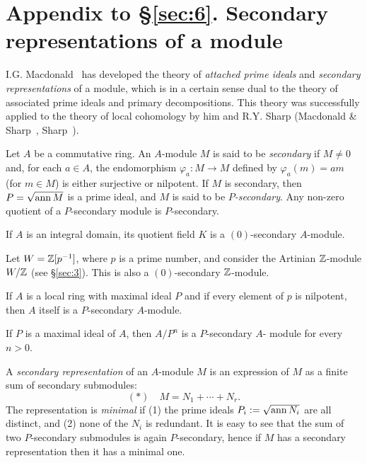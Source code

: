 \section*{Appendix to \S\ref{sec:6}. Secondary representations of a module}
{}

I.G. Macdonald~\cite{MacD1} has developed the theory of \emph{attached prime ideals}
and \emph{secondary representations} of a module, which is in a certain sense
dual to the theory of associated prime ideals and primary decompositions.
This theory was successfully applied to the theory of local cohomology
by him and R.Y. Sharp (Macdonald \& Sharp~\cite{MS1}, Sharp~\cite{Shar7}).

Let $A$ be a commutative ring. An $A$-module $M$ is said to be \emph{secondary}
if $M \neq 0$ and, for each $a \in A$, the endomorphism $\varphi_a\colon M \to M$ defined
by $\varphi_a(m) = am$ (for $m \in M$) is either surjective or nilpotent. If $M$ is secondary,
then $P = \sqrt{\operatorname{ann} M}$ is a prime ideal, and $M$ is said to be \emph{$P$-secondary}. Any
non-zero quotient of a $P$-secondary module is $P$-secondary.

\begin{example}\label{ex:6.5}
If $A$ is an integral domain, its quotient field $K$ is a $(0)$-secondary
$A$-module.
\end{example}

\begin{example}\label{ex:6.6}
Let $W = \mathbb{Z}[p^{-1}]$, where $p$ is a prime number, and consider the
Artinian $\mathbb{Z}$-module $W/\mathbb{Z}$ (see \S\ref{sec:3}). This is also a $(0)$-secondary $\mathbb{Z}$-module.
\end{example}

\begin{example}\label{ex:6.7}
If $A$ is a local ring with maximal ideal $P$ and if every element of
$p$ is nilpotent, then $A$ itself is a $P$-secondary $A$-module.
\end{example}

\begin{example}\label{ex:6.8}
If $P$ is a maximal ideal of $A$, then $A/P^n$ is a $P$-secondary $A$-
module for every $n > 0$.
\end{example}

A \emph{secondary representation} of an $A$-module $M$ is an expression of $M$ as a
finite sum of secondary submodules:
\[
  (*) \quad M = N_1 + \cdots + N_r.
\]
The representation is \emph{minimal} if (1) the prime ideals $P_i := \sqrt{\operatorname{ann} N_i}$ are all
distinct, and (2) none of the $N_i$ is redundant. It is easy to see that the sum of
two $P$-secondary submodules is again $P$-secondary, hence if $M$ has a
secondary representation then it has a minimal one.

